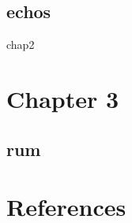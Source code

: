 \documentclass[
  man, donotrepeattitle]{apa6}
\begin{document}
\hypertarget{echos}{%
\subsection{echos}\label{echos}}

chap2

\newpage

\hypertarget{chapter-3}{%
\section{Chapter 3}\label{chapter-3}}

\hypertarget{rum}{%
\subsection{rum}\label{rum}}

\newpage

\hypertarget{references}{%
\section{References}\label{references}}

\printbibliography
\end{document}
